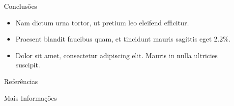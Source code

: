 \documentclass[final]{beamer}
\newlength{\sepwidth}
\newlength{\colwidth}
\newcommand{\separatorcolumn}{\begin{column}{\sepwidth}\end{column}}
\begin{document}
\begin{frame}[t]
\begin{columns}[t]
\begin{column}{\colwidth}
\begin{exampleblock}{Conclusões}
\begin{itemize}
      \item Nam dictum urna tortor, ut pretium leo eleifend efficitur.
      \item Praesent blandit faucibus quam, et tincidunt mauris sagittis eget 2.2\%.
      \item Dolor sit amet, consectetur adipiscing elit. Mauris in nulla ultricies suscipit.
    \end{itemize}
\end{exampleblock}
\begin{block}{Referências}
    \nocite{*}
    \footnotesize{}
\end{block}
\begin{block}{Mais Informações}
    
\end{block}
\end{column}
\separatorcolumn
\end{columns}
\end{frame}
\end{document}
